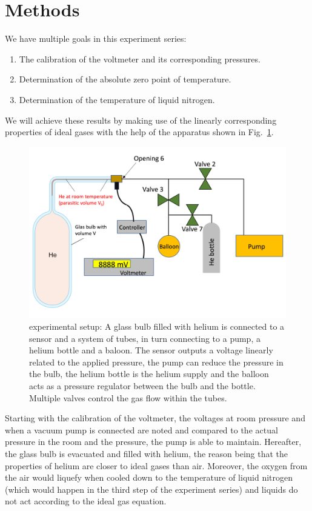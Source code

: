 \section{Methods}
    We have multiple goals in this experiment series:
    \begin{enumerate}
        \item The calibration of the voltmeter and its corresponding pressures.
        \item Determination of the absolute zero point of temperature.
        \item Determination of the temperature of liquid nitrogen.
    \end{enumerate}
    We will achieve these results by making use of the linearly corresponding properties of ideal gases with the help of the apparatus shown in Fig.~\ref{fig_setup}.

    \begin{figure}[H]
        \centering
        \includegraphics[]{src/images/experimental_setup.png}
        \caption{experimental setup: A glass bulb filled with helium is connected to a sensor and a system of tubes, in turn connecting to a pump, a helium bottle and a baloon.
        The sensor outputs a voltage linearly related to the applied pressure, the pump can reduce the pressure in the bulb, the helium bottle is the helium supply and the balloon acts as a pressure regulator between the bulb and the bottle.
        Multiple valves control the gas flow within the tubes.}
        \label{fig_setup}
    \end{figure}

    Starting with the calibration of the voltmeter, the voltages at room pressure and when a vacuum pump is connected are noted and compared to the actual pressure in the room and the pressure, the pump is able to maintain.
    Hereafter, the glass bulb is evacuated and filled with helium, the reason being that the properties of helium are closer to ideal gases than air.
    Moreover, the oxygen from the air would liquefy when cooled down to the temperature of liquid nitrogen (which would happen in the third step of the experiment series) and liquids do not act according to the ideal gas equation.


